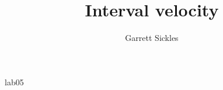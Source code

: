 
\def\thisdoc{lab05}
\def\exedirs{midpts}

\author{Garrett Sickles}
\title{Interval velocity}{\thisdoc}

% 



% 

\tiny
\clearpage

\normalsize


